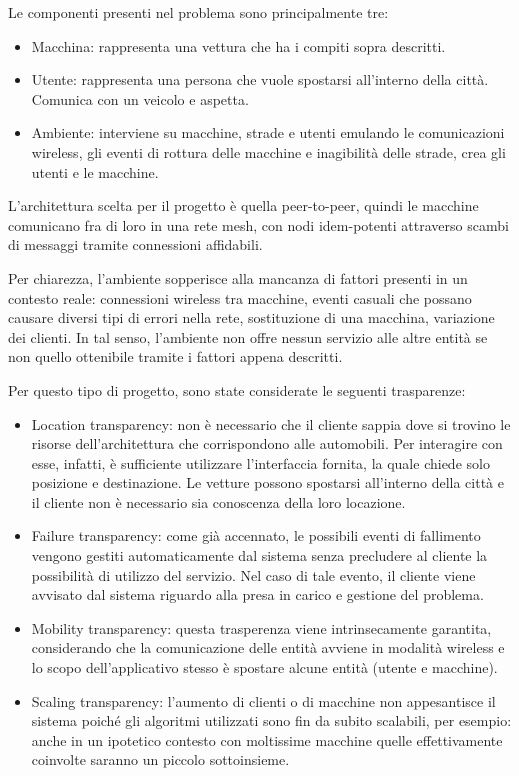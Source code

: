 Le componenti presenti nel problema sono principalmente tre:
\begin{itemize}
	\item Macchina: rappresenta una vettura che ha i compiti sopra descritti.
	\item Utente: rappresenta una persona che vuole spostarsi all'interno della città. Comunica con un veicolo e aspetta.
	\item Ambiente: interviene su macchine, strade e utenti emulando le comunicazioni wireless, gli eventi di rottura delle macchine e inagibilità delle strade, crea gli utenti e le macchine.
\end{itemize}

L'architettura scelta per il progetto è quella peer-to-peer, quindi le macchine comunicano fra di loro in una rete mesh, con nodi idem-potenti attraverso scambi di messaggi tramite connessioni affidabili.

Per chiarezza, l'ambiente sopperisce alla mancanza di fattori presenti in un contesto reale: connessioni wireless tra macchine, eventi casuali che possano causare diversi tipi di errori nella rete, sostituzione di una macchina, variazione dei clienti. In tal senso, l'ambiente non offre nessun servizio alle altre entità se non quello ottenibile tramite i fattori appena descritti.

Per questo tipo di progetto, sono state considerate le seguenti trasparenze: 
\begin{itemize}
	\item Location transparency: non è necessario che il cliente sappia dove si trovino le risorse dell'architettura che corrispondono alle automobili. Per interagire con esse, infatti, è sufficiente utilizzare l'interfaccia fornita, la quale chiede solo posizione e destinazione. Le vetture possono spostarsi all'interno della città e il cliente non è necessario sia conoscenza della loro locazione.
	\item Failure transparency: come già accennato, le possibili eventi di fallimento vengono gestiti automaticamente dal sistema senza precludere al cliente la possibilità di utilizzo del servizio. Nel caso di tale evento, il cliente viene avvisato dal sistema riguardo alla presa in carico e gestione del problema.
	\item Mobility transparency: questa trasperenza viene intrinsecamente garantita, considerando che la comunicazione delle entità avviene in modalità wireless e lo scopo dell'applicativo stesso è spostare alcune entità (utente e macchine).
	\item Scaling transparency: l'aumento di clienti o di macchine non appesantisce il sistema poiché gli algoritmi utilizzati sono fin da subito scalabili, per esempio: anche in un ipotetico contesto con moltissime macchine quelle effettivamente coinvolte saranno un piccolo sottoinsieme. 
\end{itemize}


